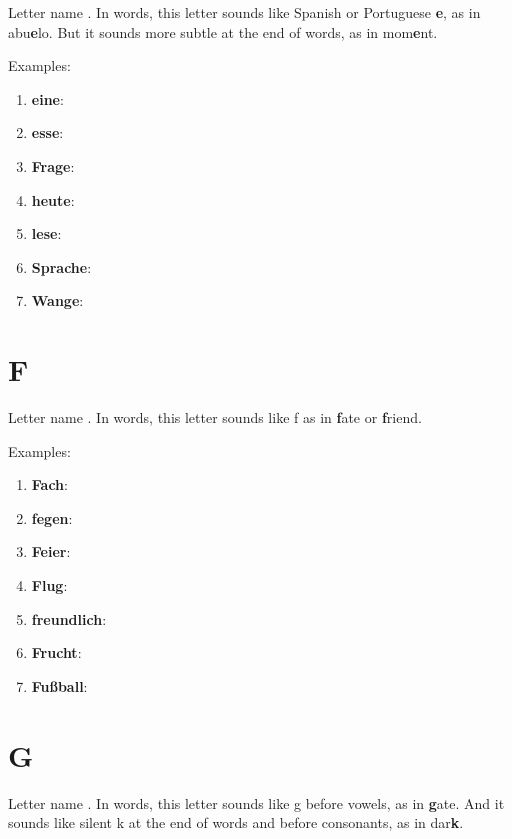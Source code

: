 Letter name \textipa{[e:]}. In words, this letter sounds like Spanish or Portuguese \textbf{e}, as in abu\textbf{e}lo. But it sounds more subtle at the end of words, as in mom\textbf{e}nt.

Examples:
\begin{enumerate}
    \item \textbf{eine}: \textipa{["aIn@]}
    \item \textbf{esse}: \textipa{["Es@]}
    \item \textbf{Frage}: \textipa{["fra:g@]}
    \item \textbf{heute}: \textipa{["hOYt@]}
    \item \textbf{lese}: \textipa{["le:s@]}
    \item \textbf{Sprache}: \textipa{["Spra:x@]}
    \item \textbf{Wange}: \textipa{["vang@]}
\end{enumerate}

\section*{F}

Letter name \textipa{[Ef]}. In words, this letter sounds like f as in \textbf{f}ate or \textbf{f}riend.

Examples:
\begin{enumerate}
    \item \textbf{Fach}: \textipa{[fax]}
    \item \textbf{fegen}: \textipa{["fe:g@n]}
    \item \textbf{Feier}: \textipa{["faI@r]}
    \item \textbf{Flug}: \textipa{[flu:k]}
    \item \textbf{freundlich}: \textipa{["frOYntlI\c{c}]}
    \item \textbf{Frucht}: \textipa{[frUxt]}
    \item \textbf{Fußball}: \textipa{["fu:sbal]}
\end{enumerate}

\section*{G}

Letter name \textipa{[ge:]}. In words, this letter sounds like g before vowels, as in \textbf{g}ate. And it sounds like silent k at the end of words and before consonants, as in dar\textbf{k}.

